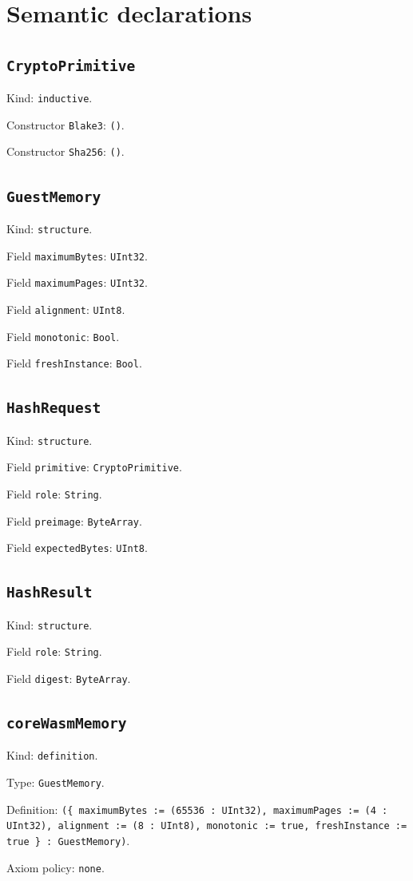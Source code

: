 \documentclass[11pt]{article}
\begin{document}
\section*{Semantic declarations}
\subsection*{\texttt{CryptoPrimitive}}
\noindent Kind: \texttt{inductive}.\par
\noindent Constructor \texttt{Blake3}: \texttt{()}.\par
\noindent Constructor \texttt{Sha256}: \texttt{()}.\par
\subsection*{\texttt{GuestMemory}}
\noindent Kind: \texttt{structure}.\par
\noindent Field \texttt{maximumBytes}: \texttt{UInt32}.\par
\noindent Field \texttt{maximumPages}: \texttt{UInt32}.\par
\noindent Field \texttt{alignment}: \texttt{UInt8}.\par
\noindent Field \texttt{monotonic}: \texttt{Bool}.\par
\noindent Field \texttt{freshInstance}: \texttt{Bool}.\par
\subsection*{\texttt{HashRequest}}
\noindent Kind: \texttt{structure}.\par
\noindent Field \texttt{primitive}: \texttt{CryptoPrimitive}.\par
\noindent Field \texttt{role}: \texttt{String}.\par
\noindent Field \texttt{preimage}: \texttt{ByteArray}.\par
\noindent Field \texttt{expectedBytes}: \texttt{UInt8}.\par
\subsection*{\texttt{HashResult}}
\noindent Kind: \texttt{structure}.\par
\noindent Field \texttt{role}: \texttt{String}.\par
\noindent Field \texttt{digest}: \texttt{ByteArray}.\par
\subsection*{\texttt{coreWasmMemory}}
\noindent Kind: \texttt{definition}.\par
\noindent Type: \texttt{GuestMemory}.\par
\noindent Definition: \texttt{(\{ maximumBytes := (65536 : UInt32), maximumPages := (4 : UInt32), alignment := (8 : UInt8), monotonic := true, freshInstance := true \} : GuestMemory)}.\par
\noindent Axiom policy: \texttt{none}.\par
\end{document}

